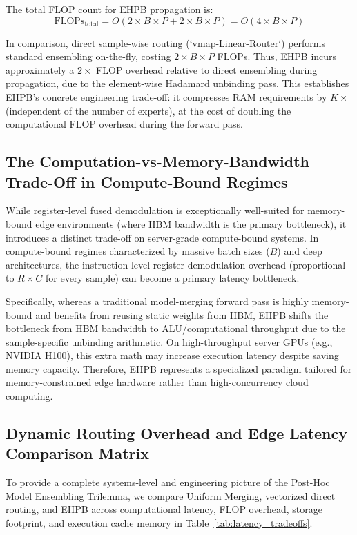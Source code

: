 \documentclass{article}
\theoremstyle{plain}
\theoremstyle{definition}
\theoremstyle{remark}
\begin{document}
The total FLOP count for EHPB propagation is:
\begin{equation}
\text{FLOPs}_{\text{total}} = O(2 \times B \times P + 2 \times B \times P) = O(4 \times B \times P)
\end{equation}

In comparison, direct sample-wise routing (`vmap-Linear-Router`) performs standard ensembling on-the-fly, costing $2 \times B \times P$ FLOPs. Thus, EHPB incurs approximately a $2\times$ FLOP overhead relative to direct ensembling during propagation, due to the element-wise Hadamard unbinding pass. This establishes EHPB's concrete engineering trade-off: it compresses RAM requirements by $K\times$ (independent of the number of experts), at the cost of doubling the computational FLOP overhead during the forward pass.

\subsection{The Computation-vs-Memory-Bandwidth Trade-Off in Compute-Bound Regimes}
While register-level fused demodulation is exceptionally well-suited for memory-bound edge environments (where HBM bandwidth is the primary bottleneck), it introduces a distinct trade-off on server-grade compute-bound systems. In compute-bound regimes characterized by massive batch sizes ($B$) and deep architectures, the instruction-level register-demodulation overhead (proportional to $R \times C$ for every sample) can become a primary latency bottleneck. 

Specifically, whereas a traditional model-merging forward pass is highly memory-bound and benefits from reusing static weights from HBM, EHPB shifts the bottleneck from HBM bandwidth to ALU/computational throughput due to the sample-specific unbinding arithmetic. On high-throughput server GPUs (e.g., NVIDIA H100), this extra math may increase execution latency despite saving memory capacity. Therefore, EHPB represents a specialized paradigm tailored for memory-constrained edge hardware rather than high-concurrency cloud computing.

\subsection{Dynamic Routing Overhead and Edge Latency Comparison Matrix}
\label{subsec:latency_tradeoffs_comparison}

To provide a complete systems-level and engineering picture of the Post-Hoc Model Ensembling Trilemma, we compare Uniform Merging, vectorized direct routing, and EHPB across computational latency, FLOP overhead, storage footprint, and execution cache memory in Table~\ref{tab:latency_tradeoffs}.
\end{document}
